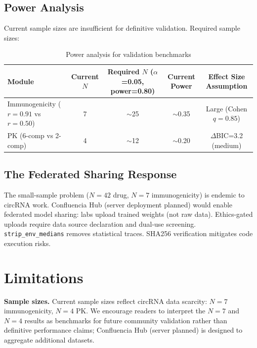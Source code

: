 \documentclass[11pt,a4paper]{article}
\begin{document}
\subsection{Power Analysis}

Current sample sizes are insufficient for definitive validation. Required sample sizes:

\begin{table}[H]
\centering
\caption{Power analysis for validation benchmarks}
\label{tab:power_analysis}
\begin{tabular}{lcccc}
\toprule
\textbf{Module} & \textbf{Current $N$} & \textbf{Required $N$ ($\alpha$=0.05, power=0.80)} & \textbf{Current Power} & \textbf{Effect Size Assumption} \\
\midrule
Immunogenicity ($r=0.91$ vs $r=0.50$) & 7 & $\sim$25 & $\sim$0.35 & Large (Cohen $q=0.85$) \\
PK (6-comp vs 2-comp) & 4 & $\sim$12 & $\sim$0.20 & $\Delta$BIC=3.2 (medium) \\
\bottomrule
\end{tabular}
\end{table}

\subsection{The Federated Sharing Response}

The small-sample problem ($N=42$ drug, $N=7$ immunogenicity) is endemic to circRNA work. Confluencia Hub (server deployment planned) would enable federated model sharing: labs upload trained weights (not raw data). Ethics-gated uploads require data source declaration and dual-use screening. \texttt{strip\_env\_medians} removes statistical traces. SHA256 verification mitigates code execution risks.

\section{Limitations}

\textbf{Sample sizes.} Current sample sizes reflect circRNA data scarcity: $N=7$ immunogenicity, $N=4$ PK. We encourage readers to interpret the $N=7$ and $N=4$ results as benchmarks for future community validation rather than definitive performance claims; Confluencia Hub (server planned) is designed to aggregate additional datasets.
\end{document}
